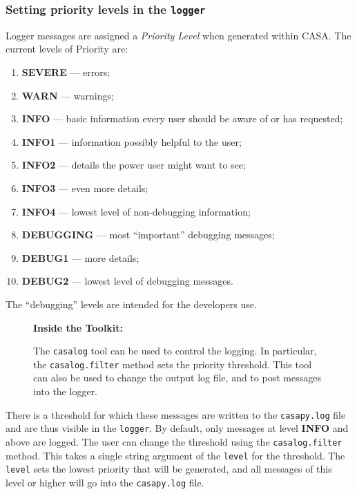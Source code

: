 \subsubsection{Setting priority levels in the {\tt logger}}
\label{section:intro.common.logger.levels}

Logger messages are assigned a {\it Priority Level} when generated
within CASA.  The current levels of Priority are:
\begin{enumerate}
\item {\bf SEVERE} --- errors;
\item {\bf WARN} --- warnings;
\item {\bf INFO} --- basic information every user should be aware of or
  has requested;
\item {\bf INFO1} --- information possibly helpful to the user;
\item {\bf INFO2} --- details the power user might want to see;
\item {\bf INFO3} --- even more details;
\item {\bf INFO4} --- lowest level of non-debugging information;
\item {\bf DEBUGGING} --- most ``important'' debugging messages;
\item {\bf DEBUG1} --- more details;
\item {\bf DEBUG2} --- lowest level of debugging messages.
\end{enumerate}
The ``debugging'' levels are intended for the developers use.

\begin{wrapfigure}{r}{2.5in}
  \begin{boxedminipage}{2.5in}
     \centerline{\bf Inside the Toolkit:}
     The {\tt casalog} tool can be used to control the logging.
     In particular, the {\tt casalog.filter} method sets the
     priority threshold.  This tool can also be used to change
     the output log file, and to post messages into the logger.
  \end{boxedminipage}
\end{wrapfigure}

There is a threshold for which these messages are
written to the {\tt casapy.log} file and are thus visible in the
{\tt logger}.  By default, only messages at level {\bf INFO} and
above are logged.  The user can change the threshold using the
{\tt casalog.filter} method.  This takes a single string argument of
the {\tt level} for the threshold.  The {\tt level} sets the lowest
priority that will be generated, and all messages of this level or
higher will go into the {\tt casapy.log} file.


